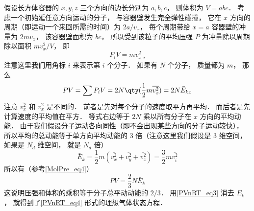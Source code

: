 假设长方体容器的 $x, y, z$ 三个方向的边长分别为 $a, b, c$， 则体积为  $V = abc$． 考虑一个初始延任意方向运动的分子， 与容器壁发生完全弹性碰撞， 它在 $x$ 方向的周期（即运动一个来回所需的时间）为 $2a/v_x$， 每个周期带给 $x = a$ 容器壁的冲量为 $2m v_x$， 该容器壁面积为 $bc$， 所以受到该粒子的平均压强 $P$ 为冲量除以周期除以面积 $mv_x^2/V$， 即
\begin{equation}
P_i V = mv_{x,i}^2
\end{equation}
注意这里我们用角标 $i$ 来表示第 $i$ 个分子． 如果有 $N$ 个分子， 质量都为 $m$， 那么
\begin{equation}
P V = \sum P_i V = 2 N \qty(\frac12 m \overline {v_x^2}) = 2 N \bar E_{kx}
\end{equation}
注意 $\overline {v_x^2}$ 和 $\bar v_x^2$ 是不同的． 前者是先对每个分子的速度取平方再平均． 而后者是先计算速度的平均值在平方． 等式右边等于 $2N$ 乘以所有分子在 $x$ 方向的平均动能． 由于我们假设分子运动各向同性（即不会出现某些方向的分子运动较快）， 所以平均的总动能等于单方向平均动能的 3 倍（注意这里我们假设是 3 维空间， 如果是 $N_d$ 维空间， 就是 $N_d$ 倍）
\begin{equation}
\bar E_k = \frac{1}{2} m (\overline {v_x^2} + \overline {v_y^2} + \overline {v_z^2}) = \frac{3}{2} m \overline {v_i^2}
\end{equation}
所以有（参考\autoref{MolPre_eq4}）
\begin{equation}
P V = \frac23 N \bar E_k
\end{equation}
这说明压强和体积的乘积等于分子总平动动能的 $2/3$． 用\autoref{PVnRT_eq3} 消去 $E_k$， 就得到了\autoref{PVnRT_eq4} 形式的理想气体状态方程．
